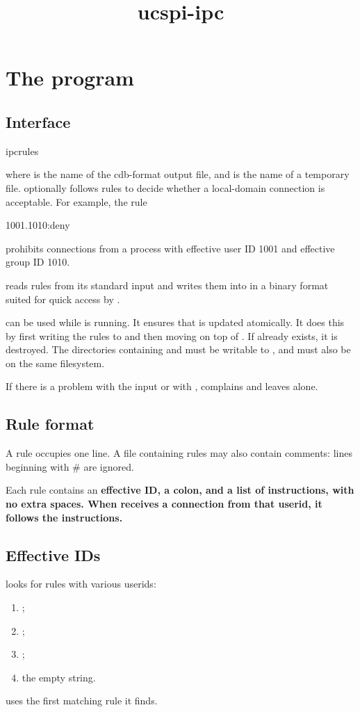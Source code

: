 \documentclass{book}
\title{ucspi-ipc}
\begin{document}
\section{The  program}

\subsection{Interface}
\begin{code}%
  ipcrules  
\end{code}
where  is the name of the cdb-format output file, and
 is the name of a temporary file.
 optionally follows rules to decide whether a
local-domain connection is acceptable.  For example, the rule
\begin{code}%
  1001.1010:deny
\end{code}
prohibits connections from a process with effective user ID 1001 and
effective group ID 1010.

 reads rules from its standard input and writes them
into  in a binary format suited for quick access by
.

 can be used while  is running.  It
ensures that  is updated atomically.  It does this by first
writing the rules to  and then moving  on top of
.  If  already exists, it is destroyed.  The
directories containing  and  must be writable to
, and must also be on the same filesystem.

If there is a problem with the input or with , 
complains and leaves  alone.

\subsection{Rule format}
A rule occupies one line.  A file containing rules may also contain
comments: lines beginning with \# are ignored.

Each rule contains an \bf{effective ID}, a colon, and a list of
\bf{instructions}, with no extra spaces.  When 
receives a connection from that userid, it follows the instructions.

\subsection{Effective IDs}
 looks for rules with various userids:
\begin{enumerate}
\item {};
\item {};
\item {};
\item the empty string.
\end{enumerate}
 uses the first matching rule it finds.
\end{document}
